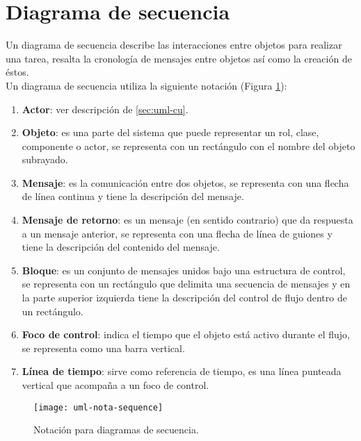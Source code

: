 \section{Diagrama de secuencia}\label{sec:uml-seq}
Un diagrama de secuencia describe las interacciones entre objetos para realizar una tarea, resalta la cronología de mensajes entre objetos así como la creación de éstos\cite{UMLClassroom, SoftwareEngineeringUML}.\\
Un diagrama de secuencia utiliza la siguiente notación\cite{UMLClassroom, SoftwareEngineeringUML} (Figura \ref{fig:uml-nota-sequence}):
\begin{enumerate}
  \item \textbf{Actor}: ver descripción de \ref{sec:uml-cu}.
  \item \textbf{Objeto}: es una parte del sistema que puede representar un rol, clase, componente o actor, se representa con un rectángulo con el nombre del objeto subrayado.
  \item \textbf{Mensaje}: es la comunicación entre dos objetos, se representa con una flecha de línea continua y tiene la descripción del mensaje.
  \item \textbf{Mensaje de retorno}: es un mensaje (en sentido contrario) que da respuesta a un mensaje anterior, se representa con una flecha de línea de guiones y tiene la descripción del contenido del mensaje.
  \item \textbf{Bloque}: es un conjunto de mensajes unidos bajo una estructura de control, se representa con un rectángulo que delimita una secuencia de mensajes y en la parte superior izquierda tiene la descripción del control de flujo dentro de un rectángulo.
  \item \textbf{Foco de control}: indica el tiempo que el objeto está activo durante el flujo, se representa como una barra vertical.
  \item \textbf{Línea de tiempo}: sirve como referencia de tiempo, es una línea punteada vertical que acompaña a un foco de control.
\end{enumerate}

\begin{figure}[h]
  \centering
  \texttt{[image: uml-nota-sequence]}
  \caption{Notación para diagramas de secuencia\cite{SoftwareEngineeringUML}.}
  \label{fig:uml-nota-sequence}
\end{figure}


